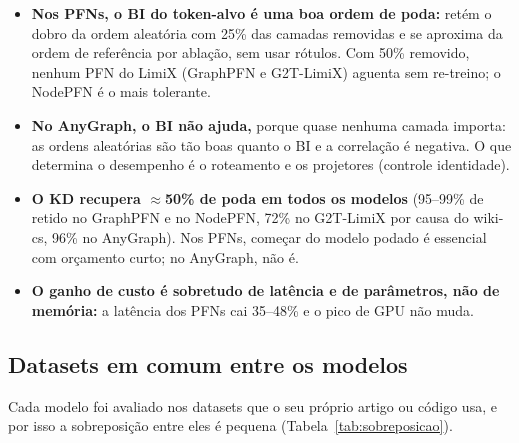 \documentclass[12pt,a4paper]{article}
\begin{document}
\begin{itemize}
  \item \textbf{Nos PFNs, o BI do token-alvo é uma boa ordem de poda:} retém o dobro da ordem aleatória com 25\% das camadas removidas e se aproxima da ordem de referência por ablação, sem usar rótulos. Com 50\% removido, nenhum PFN do LimiX (GraphPFN e G2T-LimiX) aguenta sem re-treino; o NodePFN é o mais tolerante.
  \item \textbf{No AnyGraph, o BI não ajuda,} porque quase nenhuma camada importa: as ordens aleatórias são tão boas quanto o BI e a correlação é negativa. O que determina o desempenho é o roteamento e os projetores (controle identidade).
  \item \textbf{O KD recupera $\approx$50\% de poda em todos os modelos} (95--99\% de retido no GraphPFN e no NodePFN, 72\% no G2T-LimiX por causa do wiki-cs, 96\% no AnyGraph). Nos PFNs, começar do modelo podado é essencial com orçamento curto; no AnyGraph, não é.
  \item \textbf{O ganho de custo é sobretudo de latência e de parâmetros, não de memória:} a latência dos PFNs cai 35--48\% e o pico de GPU não muda.
\end{itemize}

\subsection{Datasets em comum entre os modelos}
\label{sec:sobreposicao}

Cada modelo foi avaliado nos datasets que o seu próprio artigo ou código usa, e por isso a sobreposição entre eles é pequena (Tabela~\ref{tab:sobreposicao}).
\end{document}

